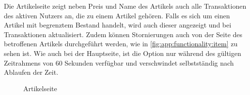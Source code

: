 Die Artikelseite zeigt neben Preis und Name des Artikels auch alle Transaktionen des aktiven Nutzers an, die zu einem Artikel gehören.
Falls es sich um einen Artikel mit begrenztem Bestand handelt, wird auch dieser angezeigt und bei Transaktionen aktualisiert.
Zudem können Stornierungen auch von der Seite des betroffenen Artikels durchgeführt werden, wie in \autoref{fig:app:functionality:item} zu sehen ist.
Wie auch bei der Hauptseite, ist die Option nur während des gültigen Zeitrahmens von 60 Sekunden verfügbar und verschwindet selbstständig nach Ablaufen der Zeit.
\begin{figure}%
	\centering
	\qquad
	\caption{Artikelseite}%
	\label{fig:app:functionality:item}%
\end{figure}

